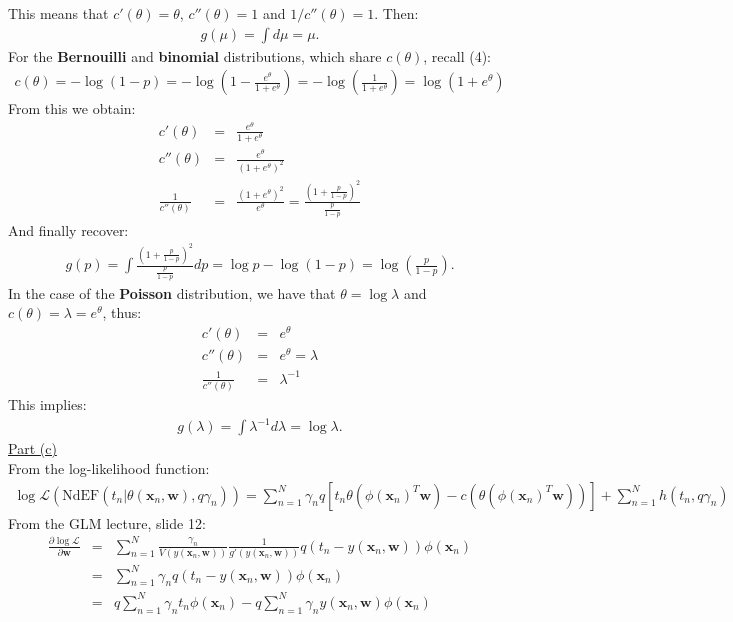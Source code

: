 \documentclass[a4paper, 11pt]{article}
\begin{document}
This means that $c'(\theta) = \theta$, $c''(\theta) = 1$ and $1/c''(\theta) = 1$. Then:
\begin{eqnarray}
g(\mu) = \int d\mu = \mu. \nonumber
\end{eqnarray}
For the \textbf{Bernouilli} and \textbf{binomial} distributions, which share $c(\theta)$, recall (4):
\begin{eqnarray}
c(\theta) = -\log{(1-p)} = -\log{\left( 1 - \frac{e^\theta}{1+e^\theta} \right)} = -\log{\left( \frac{1}{1+e^\theta} \right)} = \log{(1 + e^\theta)} \nonumber
\end{eqnarray}
From this we obtain:
\begin{eqnarray}
c'(\theta) &=& \frac{e^\theta}{1 + e^\theta} \nonumber \\
c''(\theta) &=& \frac{e^\theta}{(1 + e^\theta)^2}\nonumber \\
\frac{1}{c''(\theta)} &=& \frac{(1 + e^\theta)^2}{e^\theta} = \frac{\left(1 + \frac{p}{1-p}\right)^2}{\frac{p}{1-p}} \nonumber
\end{eqnarray}
And finally recover:
\begin{eqnarray}
g(p) = \int \frac{(1 + \frac{p}{1-p})^2}{\frac{p}{1-p}} dp = \log p - \log{(1-p)} = \log{\left(\frac{p}{1-p}\right)}. \nonumber
\end{eqnarray}
In the case of the \textbf{Poisson} distribution, we have that $\theta = \log \lambda$ and $c(\theta) = \lambda = e^{\theta}$, thus:
\begin{eqnarray}
c'(\theta) &=& e^{\theta} \nonumber \\
c''(\theta) &=& e^{\theta}  = \lambda \nonumber \\
\frac{1}{c''(\theta)} &=& \lambda^{-1} \nonumber
\end{eqnarray}
This implies:
\begin{eqnarray}
g(\lambda) = \int \lambda^{-1} d\lambda = \log \lambda. \nonumber
\end{eqnarray}
\newline \underline{Part (c)}\\
\newline From the log-likelihood function:
\begin{eqnarray}
\log \mathcal{L} \left( \text{NdEF}( t_n | \theta (\mathbf{x}_n, \mathbf{w}), q \gamma_n ) \right) = \sum_{n=1}^{N} \gamma_n q [ t_n \theta( \phi(\mathbf{x}_n)^T \mathbf{w}) - c(\theta(\phi(\mathbf{x}_n)^T \mathbf{w})) ] + \sum_{n=1}^{N} h(t_n, q \gamma_n) \nonumber
\end{eqnarray}
From the GLM lecture, slide 12:
\begin{eqnarray}
\frac{\partial \log \mathcal{L}}{\partial \mathbf{w}} &=& \sum_{n=1}^{N} \frac{\gamma_n}{V(y(\mathbf{x}_n, \mathbf{w}))} \frac{1}{g'(y(\mathbf{x}_n, \mathbf{w}))} q(t_n - y(\mathbf{x}_n, \mathbf{w})) \phi(\mathbf{x}_n)  \nonumber \\
&=& \sum_{n=1}^{N} \gamma_n q(t_n - y(\mathbf{x}_n, \mathbf{w})) \phi(\mathbf{x}_n) \nonumber \\
&=& q \sum_{n=1}^{N} \gamma_n t_n \phi(\mathbf{x}_n) - q \sum_{n=1}^{N} \gamma_n y(\mathbf{x}_n, \mathbf{w}) \phi(\mathbf{x}_n)   \nonumber
\end{eqnarray}
\end{document}
